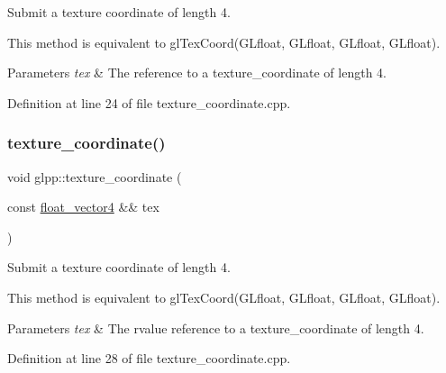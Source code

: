 Submit a texture coordinate of length 4. 

This method is equivalent to gl\+Tex\+Coord(\+G\+Lfloat, G\+Lfloat, G\+Lfloat, G\+Lfloat).


\begin{DoxyParams}{Parameters}
{\em tex} & The reference to a texture\+\_\+coordinate of length 4. \\
\hline
\end{DoxyParams}


Definition at line 24 of file texture\+\_\+coordinate.\+cpp.

\mbox{\label{namespaceglpp_a727361510680fdf574b07ab54e008301}} 
\subsubsection{\texorpdfstring{texture\+\_\+coordinate()}{texture\_coordinate()}\hspace{0.1cm}{\footnotesize\ttfamily [6/8]}}
{\footnotesize\ttfamily void glpp\+::texture\+\_\+coordinate (\begin{DoxyParamCaption}\item[{const \hyperlink{namespaceglpp_ab4a3d7b8ed8e2e4810006eef5213a460}{float\+\_\+vector4} \&\&}]{tex }\end{DoxyParamCaption})\hspace{0.3cm}{\ttfamily [noexcept]}}



Submit a texture coordinate of length 4. 

This method is equivalent to gl\+Tex\+Coord(\+G\+Lfloat, G\+Lfloat, G\+Lfloat, G\+Lfloat).


\begin{DoxyParams}{Parameters}
{\em tex} & The rvalue reference to a texture\+\_\+coordinate of length 4. \\
\hline
\end{DoxyParams}


Definition at line 28 of file texture\+\_\+coordinate.\+cpp.

\mbox{\label{namespaceglpp_a8064de92190f865e6119e1f1639046c6}} 

